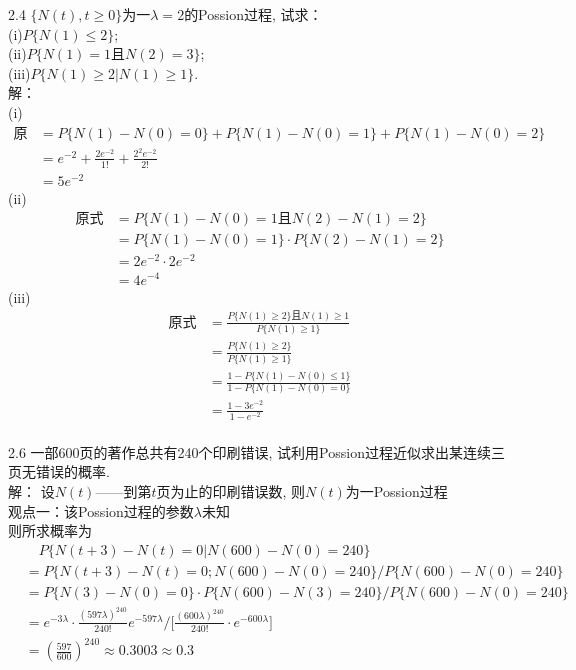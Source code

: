 2.4 $\{N(t), t \geqslant 0\}$为一$\lambda = 2$的Possion过程, 试求：\\
	(i)$P\{N(1) \leqslant 2\}$;\\
	(ii)$P\{N(1) = 1 \text{且}N(2) = 3\}$;\\
	(iii)$P\{N(1) \geqslant 2 | N(1) \geqslant 1\}$.\\
	解：\\
	(i)\begin{align*}
	\text{原式} & = P\{N(1) - N(0) = 0\} + P\{N(1) - N(0) = 1\} + P\{N(1) - N(0) = 2\}\\
						& = e^{-2} + \frac{2e^{-2}}{1!}+\frac{2^2e^{-2}}{2!}\\
						& = 5e^{-2}
	\end{align*}
	(ii)\begin{align*}
	\text{原式} & = P\{N(1) - N(0) = 1 \text{且}N(2) - N(1) = 2\}\\
				& = P\{N(1) - N(0) = 1\} \cdot P\{N(2) - N(1) = 2\}\\
				& = 2e^{-2} \cdot 2e^{-2}\\
				& = 4e^{-4}
	\end{align*}
	(iii)\begin{align*}
	\text{原式} & = \frac{P\{N(1) \geqslant 2\} \text{且} N(1) \geqslant 1}{P\{N(1) \geqslant 1\}}\\
				& = \frac{P\{N(1) \geqslant 2\}}{P\{N(1) \geqslant 1\}}\\
				& = \frac{1-P\{N(1)-N(0) \leqslant 1\}}{1-P\{N(1)-N(0)=0\}}\\
				& = \frac{1-3e^{-2}}{1-e^{-2}}\\
	\end{align*}




2.6 一部600页的著作总共有240个印刷错误, 试利用Possion过程近似求出某连续三页无错误的概率.\\
	解：
	设$N(t)$——到第$t$页为止的印刷错误数, 则$N(t)$为一Possion过程\\
	观点一：该Possion过程的参数$\lambda$未知\\
	则所求概率为
	\begin{align*}
	& \quad P\{N(t+3) - N(t) = 0 | N(600) - N(0) = 240\}\\
	& = P\{N(t+3)-N(t)=0;N(600)-N(0)=240\}/P\{N(600)-N(0)=240\}\\
	& = P\{N(3)-N(0)=0\}\cdot P\{N(600)-N(3)=240\}/P\{N(600)-N(0)=240\}\\
	& = e^{-3\lambda}\cdot \frac{(597\lambda)^{240}}{240!}e^{-597\lambda} \Bigg/ \bigg[ \frac{(600\lambda)^{240}}{240!} \cdot e^{-600\lambda} \bigg]\\
	& = \left(\frac{597}{600}\right)^{240} \approx 0.3003 \approx 0.3
	\end{align*}

